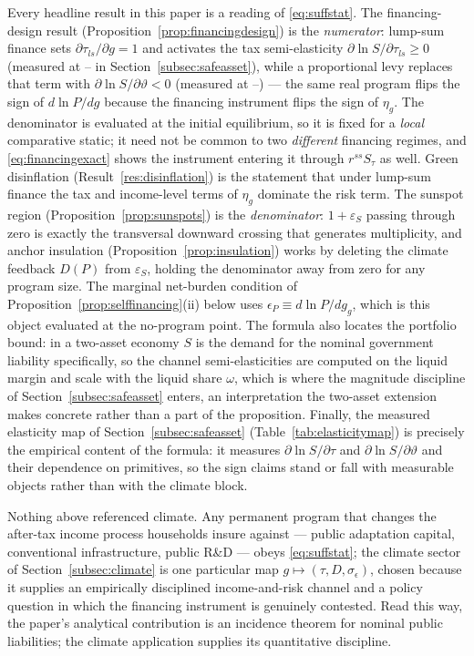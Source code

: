\documentclass[12pt]{article}
\providecommand{\pendingnum}{\textit{--}}
\providecommand{\epsTau}{\pendingnum}\providecommand{\epsLevy}{\pendingnum}
\newcommand{\Sfun}{S}
\begin{document}
Every headline result in this paper is a reading of \eqref{eq:suffstat}.
The financing-design result (Proposition~\ref{prop:financingdesign}) is the
\emph{numerator}: lump-sum finance sets $\partial\tau_{ls}/\partial g=1$ and
activates the tax semi-elasticity $\partial\ln\Sfun/\partial\tau_{ls}\ge0$
(measured at $\epsTau$ in
Section~\ref{subsec:safeasset}), while a proportional levy replaces that
term with $\partial\ln\Sfun/\partial\vartheta<0$ (measured at $\epsLevy$)
--- the same real
program flips the sign of $d\ln P/dg$ because the financing instrument flips
the sign of $\eta_g$. The denominator is evaluated at the initial
equilibrium, so it is fixed for a \emph{local} comparative static; it need
not be common to two \emph{different} financing regimes, and
\eqref{eq:financingexact} shows the instrument entering it through
$r^{ss}\Sfun_\tau$ as well. Green disinflation
(Result~\ref{res:disinflation}) is the statement that under lump-sum finance
the tax and income-level terms of $\eta_g$ dominate the risk term. The
sunspot region (Proposition~\ref{prop:sunspots}) is the \emph{denominator}:
$1+\varepsilon_S$ passing through zero is exactly the transversal downward
crossing that generates multiplicity, and anchor insulation
(Proposition~\ref{prop:insulation}) works by deleting the climate feedback
$D(P)$ from $\varepsilon_S$, holding the denominator away from zero for any
program size. The marginal net-burden condition of
Proposition~\ref{prop:selffinancing}(ii) below uses
$\epsilon_P\equiv d\ln P/dg_g$, which is this object evaluated at the
no-program point. The formula also locates the portfolio bound: in a
two-asset economy $\Sfun$ is the demand for the nominal government
liability specifically, so the channel semi-elasticities are computed on
the liquid margin and scale with the liquid share $\omega$, which is
where the magnitude discipline of Section~\ref{subsec:safeasset} enters,
an interpretation the two-asset extension makes concrete rather than a
part of the proposition. Finally, the measured elasticity map of
Section~\ref{subsec:safeasset} (Table~\ref{tab:elasticitymap}) is precisely
the empirical content of the formula: it measures
$\partial\ln\Sfun/\partial\tau$ and $\partial\ln\Sfun/\partial\vartheta$
and their dependence on primitives, so the sign claims stand
or fall with measurable objects rather than with the climate block.

Nothing above referenced climate. Any permanent program that changes the
after-tax income process households insure against --- public adaptation
capital, conventional infrastructure, public R\&D --- obeys
\eqref{eq:suffstat}; the climate sector of Section~\ref{subsec:climate} is
one particular map $g\mapsto(\tau,D,\sigma_\epsilon)$, chosen because it
supplies an empirically disciplined income-and-risk channel and a
policy question in which the financing instrument is genuinely contested.
Read this way, the paper's analytical contribution is an incidence theorem
for nominal public liabilities; the climate application supplies its
quantitative discipline.
\end{document}
